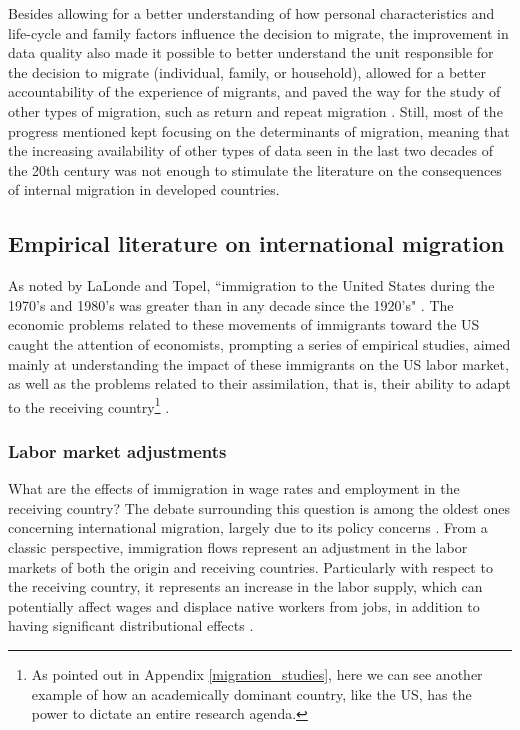 Besides allowing for a better understanding of how personal characteristics and life-cycle and family factors influence the decision to migrate, the improvement in data quality also made it possible to better understand the unit responsible for the decision to migrate (individual, family, or household), allowed for a better accountability of the experience of migrants, and paved the way for the study of other types of migration, such as return and repeat migration \citep{greenwood_human_1985, greenwood_internal_1997}. Still, most of the progress mentioned kept focusing on the determinants of migration, meaning that the increasing availability of other types of data seen in the last two decades of the 20th century was not enough to stimulate the literature on the consequences of internal migration in developed countries.

\subsection{Empirical literature on international migration} \label{lit_review_empirical_international}

As noted by LaLonde and Topel, ``immigration to the United States during the 1970's and 1980's was greater than in any decade since the 1920's" \citep[p. 297]{lalonde_immigrants_1991}. The economic problems related to these movements of immigrants toward the US caught the attention of economists, prompting a series of empirical studies, aimed mainly at understanding the impact of these immigrants on the US labor market, as well as the problems related to their assimilation, that is, their ability to adapt to the receiving country\footnote{As pointed out in Appendix \ref{migration_studies}, here we can see another example of how an academically dominant country, like the US, has the power to dictate an entire research agenda.} \citep{greenwood_factor_1986, lalonde_economic_1997}.

\subsubsection{Labor market adjustments}

What are the effects of immigration in wage rates and employment in the receiving country? The debate surrounding this question is among the oldest ones concerning international migration, largely due to its policy concerns \citep{greenwood_factor_1986}. From a classic perspective, immigration flows represent an adjustment in the labor markets of both the origin and receiving countries. Particularly with respect to the receiving country, it represents an increase in the labor supply, which can potentially affect wages and displace native workers from jobs, in addition to having significant distributional effects \citep{greenwood_factor_1986, lalonde_immigrants_1991, lalonde_labor_1991, lalonde_economic_1997}. 

